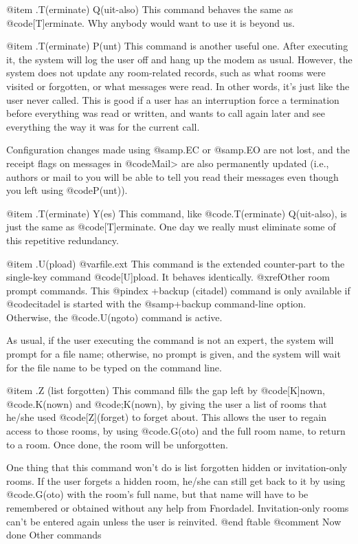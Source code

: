 @item .T(erminate) Q(uit-also)
This command behaves the same as @code{[T]erminate}.  Why anybody
would want to use it is beyond us.

@item .T(erminate) P(unt)
This command is another useful one.  After executing it, the
system will log the user off and hang up the modem as usual.  However,
the system does not update any room-related records, such as what
rooms were visited or forgotten, or what messages were read.  In other
words, it's
just like the user never called.  This is good if a user has an
interruption force a termination before everything was read or written,
and wants to call again later and see everything the way it was for the
current call.

Configuration changes made using @samp{.EC} or @samp{.EO} are not lost,
and the receipt flags on messages in @code{Mail>} are also permanently
updated (i.e., authors or mail to you will be able to tell you read their
messages even though you left using @code{P(unt)}).

@item .T(erminate) Y(es)
This command, like @code{.T(erminate) Q(uit-also)}, is just the
same as @code{[T]erminate}.  One day we really must eliminate some of this
repetitive redundancy.

@item .U(pload) @var{file.ext}
This command is the extended counter-part to the single-key
command @code{[U]pload}.  It behaves identically.  @xref{Other room prompt
commands}.  This
@pindex +backup (citadel)
command is only available if @code{citadel} is started
with the @samp{+backup} command-line option.  Otherwise, the @code{.U(ngoto)}
command is active.

As usual, if the user executing the
command is not an expert, the system will prompt for a file name;
otherwise, no prompt is given, and the system will wait for the file
name to be typed on the command line.

@item .Z (list forgotten)
This command fills the gap left by @code{[K]nown}, @code{.K(nown)} and
@code{;K(nown)}, by giving the user a list of rooms that he/she used
@code{[Z](forget)} to forget about.  This allows the user to regain access
to those rooms, by using @code{.G(oto)} and the full room name, to return to
a room.  Once done, the room will be unforgotten.

One thing that this command won't do is list forgotten hidden
or invitation-only rooms.  If the user forgets a hidden room, he/she
can still get back to it by using @code{.G(oto)} with the room's full name,
but that name will have to be remembered or obtained without any help
from Fnordadel.  Invitation-only rooms can't be entered again unless
the user is reinvited.
@end ftable
@comment Now done Other commands

